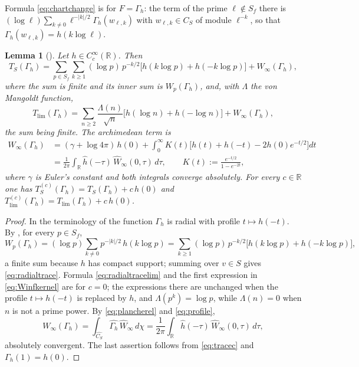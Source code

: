 \documentclass[11pt]{amsart}
\newtheorem{lemma}[theorem]{Lemma}
\theoremstyle{remark}
\numberwithin{equation}{section}
\newcommand{\R}{\mathbb R}
\newcommand{\CS}{C_S}
\newcommand{\Tl}{T_{\lim}}
\begin{document}
Formula \eqref{eq:chartchange} is \cite[(101)]{P43} for $F=\Gamma_h$: the term
of the prime $\ell\notin S_f$ there is
$(\log\ell)\sum_{k\ne0}\ell^{-|k|/2}\Gamma_h(w_{\ell,k})$ with
$w_{\ell,k}\in\CS$ of module $\ell^{-k}$, so that
$\Gamma_h(w_{\ell,k})=h(k\log\ell)$.

\begin{lemma}[{\cite[(82) and Lemma~A.1]{P43}}]
\label{lem:radial-trace}
Let $h\in C_c^\infty(\R)$.  Then
\begin{equation}
\label{eq:radialtrace}
  T_S(\Gamma_h)=\sum_{p\in S_f}\sum_{k\ge1}(\log p)\,p^{-k/2}
     \bigl[h(k\log p)+h(-k\log p)\bigr]+W_\infty(\Gamma_h) ,
\end{equation}
where the sum is finite and its inner sum is $W_p(\Gamma_h)$, and, with
$\Lambda$ the von Mangoldt function,
\begin{equation}
\label{eq:radialtracelim}
  \Tl(\Gamma_h)=\sum_{n\ge2}\frac{\Lambda(n)}{\sqrt n}
     \bigl[h(\log n)+h(-\log n)\bigr]+W_\infty(\Gamma_h) ,
\end{equation}
the sum being finite.  The archimedean term is
\begin{equation}
\label{eq:Winfkernel}
\begin{aligned}
  W_\infty(\Gamma_h)
  &=(\gamma+\log4\pi)\,h(0)+\int_0^\infty K(t)
    \bigl[h(t)+h(-t)-2h(0)e^{-t/2}\bigr]dt\\
  &=\frac1{2\pi}\int_\R\hat h(-\tau)\,\widehat W_\infty(0,\tau)\,d\tau ,
  \qquad K(t):=\frac{e^{-t/2}}{1-e^{-2t}} ,
\end{aligned}
\end{equation}
where $\gamma$ is Euler's constant and both integrals converge absolutely.
For every $c\in\R$ one has $T^{(c)}_S(\Gamma_h)=T_S(\Gamma_h)+c\,h(0)$ and
$T^{(c)}_{\lim}(\Gamma_h)=\Tl(\Gamma_h)+c\,h(0)$.
\end{lemma}

\begin{proof}
In the terminology of \cite{P43} the function $\Gamma_h$ is radial with
profile $t\mapsto h(-t)$.  By \cite[(82)]{P43}, for every $p\in S_f$,
\[
  W_p(\Gamma_h)=(\log p)\sum_{k\ne0}p^{-|k|/2}\,h(k\log p)
  =\sum_{k\ge1}(\log p)\,p^{-k/2}\bigl[h(k\log p)+h(-k\log p)\bigr],
\]
a finite sum because $h$ has compact support; summing over $v\in S$ gives
\eqref{eq:radialtrace}.  Formula \eqref{eq:radialtracelim} and the first
expression in \eqref{eq:Winfkernel} are \cite[Lemma~A.1]{P43} for $c=0$; the
expressions there are unchanged when the profile $t\mapsto h(-t)$ is
replaced by $h$, and $\Lambda(p^k)=\log p$, while $\Lambda(n)=0$ when $n$ is
not a prime power.  By \eqref{eq:plancherel} and \eqref{eq:profile},
\[
  W_\infty(\Gamma_h)=\int_{\widehat{\CS}}\widehat{\Gamma_h}\,
  \widehat W_\infty\,d\chi
  =\frac1{2\pi}\int_\R\hat h(-\tau)\,\widehat W_\infty(0,\tau)\,d\tau ,
\]
absolutely convergent.  The last assertion follows from \eqref{eq:tracec}
and $\Gamma_h(1)=h(0)$.
\end{proof}
\end{document}
